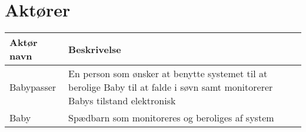 \section{Aktører}



\begin{table}[!htbp] \centering
	\begin{tabular}{|p{2.5cm}|p{11.5cm}|}
	\hline
		\textbf{Aktør navn} & \textbf{Beskrivelse} \\\hline
		Babypasser 
		& En person som ønsker at benytte systemet til at 
		  berolige Baby til at falde i søvn samt monitorerer Babys tilstand elektronisk
		\\\hline
		Baby 
		& Spædbarn som monitoreres og beroliges af system
		\\\hline
	\end{tabular}
\end{table}